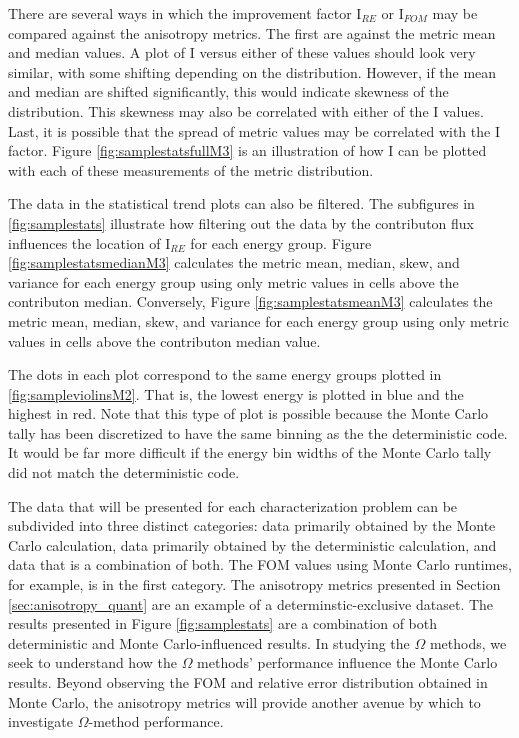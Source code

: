 There are several ways in which the improvement
factor I$_{RE}$ or I$_{FOM}$ may be compared against the anisotropy metrics. The
first are against the metric mean and median values. A plot of I versus either
of these values should look very similar, with some shifting depending on the
distribution. However, if the mean and median are shifted significantly, this
would indicate skewness of the distribution. This skewness may also be correlated with
either
of the I values. Last, it is possible that the spread of metric values may be
correlated with the I factor. Figure \ref{fig:samplestatsfullM3} is an
illustration of how I can be plotted with
each of these measurements of the metric distribution.

The data in the statistical trend plots can also be
filtered. The subfigures in \ref{fig:samplestats} illustrate how filtering out
the data by the contributon flux influences the location of I$_{RE}$ for each
energy group. Figure \ref{fig:samplestatsmedianM3} calculates the
metric mean, median, skew, and variance for each energy group using only metric
values in cells above the contributon median. Conversely, Figure
\ref{fig:samplestatsmeanM3} calculates the metric mean, median, skew, and
variance for each energy group using only metric values in cells above the
contributon median value.

The dots in each plot correspond to the same energy
groups plotted in \ref{fig:sampleviolinsM2}. That is, the lowest energy is
plotted in blue and the highest in red. Note that this type of plot is
possible because the Monte Carlo tally has been discretized to have
the same binning as the the deterministic code. It would be far more difficult
if the energy bin widths of the Monte Carlo tally did not match the
deterministic code.


The data that will be presented for each characterization problem
can be subdivided into three distinct
categories: data primarily obtained by the Monte Carlo calculation, data
primarily obtained by the deterministic calculation, and data that is a
combination of both. The FOM values using Monte Carlo runtimes, for example, is
in the first category. The anisotropy metrics presented in Section
\ref{sec:anisotropy_quant} are an example of a determinstic-exclusive dataset.
The results presented in Figure \ref{fig:samplestats} are a combination of both
deterministic and Monte Carlo-influenced results. In studying the $\Omega$
methods, we seek to understand how the $\Omega$ methods' performance influence
the Monte Carlo results. Beyond observing the FOM and relative error
distribution obtained in Monte Carlo, the anisotropy metrics will provide
another avenue by which to investigate $\Omega$-method performance.

